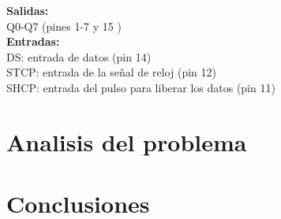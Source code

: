 \documentclass{article}
\begin{document}
\noindent\textbf{Salidas:}\\ 
\indent Q0-Q7 (pines 1-7 y 15 )\\
\textbf{Entradas:}\\
\indent DS: entrada de datos (pin 14)\\
\indent STCP: entrada de la señal de reloj (pin 12)\\
\indent SHCP: entrada del pulso para liberar los datos (pin 11)


\section{Analisis del problema} \label{analisis}



\section{Conclusiones} \label{conclusiones}




\end{document}
